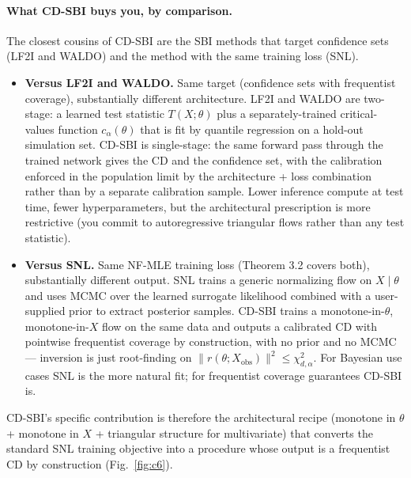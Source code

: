 \documentclass[11pt]{article}
\providecommand{\tightlist}{\setlength{\itemsep}{0pt}\setlength{\parskip}{0pt}}
\begin{document}
\paragraph{What CD-SBI buys you, by comparison.}
The closest cousins of CD-SBI are the SBI methods that target
confidence sets (LF2I and WALDO) and the method with the same training
loss (SNL).

\begin{itemize}
\tightlist
\item
  \textbf{Versus LF2I and WALDO.} Same target (confidence sets with
  frequentist coverage), substantially different architecture. LF2I and
  WALDO are two-stage: a learned test statistic \(T(X; \theta)\) plus a
  separately-trained critical-values function \(c_\alpha(\theta)\) that
  is fit by quantile regression on a hold-out simulation set. CD-SBI is
  single-stage: the same forward pass through the trained network gives
  the CD and the confidence set, with the calibration enforced in the
  population limit by the architecture + loss combination rather than
  by a separate calibration sample. Lower inference compute at test
  time, fewer hyperparameters, but the architectural prescription is
  more restrictive (you commit to autoregressive triangular flows
  rather than any test statistic).
\item
  \textbf{Versus SNL.} Same NF-MLE training loss (Theorem 3.2 covers
  both), substantially different output. SNL trains a generic
  normalizing flow on \(X \mid \theta\) and uses MCMC over the learned
  surrogate likelihood combined with a user-supplied prior to extract
  posterior samples. CD-SBI trains a monotone-in-\(\theta\),
  monotone-in-\(X\) flow on the same data and outputs a calibrated CD
  with pointwise frequentist coverage by construction, with no prior
  and no MCMC --- inversion is just root-finding on
  \(\|r(\theta; X_\mathrm{obs})\|^2 \le \chi^2_{d, \alpha}\). For
  Bayesian use cases SNL is the more natural fit; for frequentist
  coverage guarantees CD-SBI is.
\end{itemize}

CD-SBI's specific contribution is therefore the architectural recipe
(monotone in \(\theta\) + monotone in \(X\) + triangular structure for
multivariate) that converts the standard SNL training objective into a
procedure whose output is a frequentist CD by construction (Fig.~\ref{fig:c6}).
\end{document}
